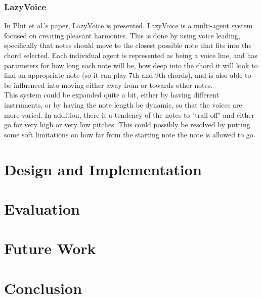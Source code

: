 \documentclass[a4paper,english]{report}
\begin{document}
	\subsection{LazyVoice}
	In Plut et al.'s paper, LazyVoice is presented. LazyVoice is a multi-agent system focused on creating pleasant harmonies. This is done by using voice leading, specifically that notes should move to the closest possible note that fits into the chord selected. Each individual agent is represented as being a voice line, and has parameters for how long each note will be, how deep into the chord it will look to find an appropriate note (so it can play 7th and 9th chords), and is also able to be influenced into moving either away from or towards other notes.\\
	This system could be expanded quite a bit, either by having different instruments, or by having the note length be dynamic, so that the voices are more varied. In addition, there is a tendency of the notes to "trail off" and either go for very high or very low pitches. This could possibly be resolved by putting some soft limitations on how far from the starting note the note is allowed to go.
	\fi
	
	\chapter{Design and Implementation}
	
	\chapter{Evaluation}
	
	\chapter{Future Work}
	
	\chapter{Conclusion}
	 
\end{document}
